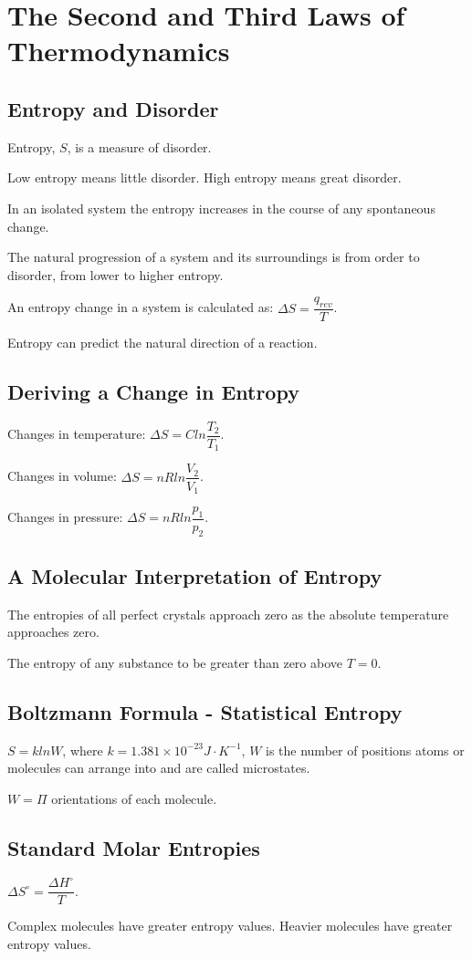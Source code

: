 \documentclass[a4paper,12pt]{article}
\begin{document}
\section{The Second and Third Laws of Thermodynamics}
\subsection{Entropy and Disorder}
Entropy, $S$, is a measure of disorder.\par
Low entropy means little disorder.
High entropy means great disorder.\par
In an isolated system the entropy increases in the course of any spontaneous change.\par
The natural progression of a system and its surroundings is from order to disorder, from lower to higher entropy.\par
An entropy change in a system is calculated as: $\Delta S = \dfrac{q_{rev}}{T}$.\par
Entropy can predict the natural direction of a reaction.
\subsection{Deriving a Change in Entropy}
Changes in temperature: $\Delta S=Cln\dfrac{T_{2}}{T_{1}}$.\par
Changes in volume: $\Delta S=nRln\dfrac{V_{2}}{V_{1}}$.\par
Changes in pressure: $\Delta S=nRln\dfrac{p_{1}}{p_{2}}$.
\subsection{A Molecular Interpretation of Entropy}
The entropies of all perfect crystals approach zero as the absolute temperature approaches zero.\par
The entropy of any substance to be greater than zero above $T = 0$.
\subsection{Boltzmann Formula - Statistical Entropy}
$S=klnW$, where $k = 1.381 \times 10^{-23} J\cdot K^{-1}$, $W$ is the number of positions atoms or molecules can arrange into and are called microstates.\par
$W=\Pi$ orientations of each molecule.
\subsection{Standard Molar Entropies}
$\Delta S^{\circ}=\dfrac{\Delta H^{\circ}}{T}$.\par
Complex molecules have greater entropy values. Heavier molecules have greater entropy values.
\end{document}
